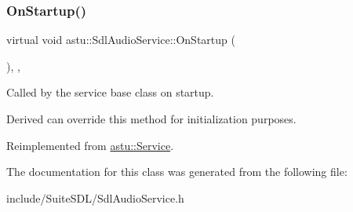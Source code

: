 \mbox{\label{classastu_1_1SdlAudioService_a1138e9e9ab37cbc78e37a6e529561c3b}} 
\subsubsection{\texorpdfstring{On\+Startup()}{OnStartup()}}
{\footnotesize\ttfamily virtual void astu\+::\+Sdl\+Audio\+Service\+::\+On\+Startup (\begin{DoxyParamCaption}{ }\end{DoxyParamCaption})\hspace{0.3cm}{\ttfamily [override]}, {\ttfamily [protected]}, {\ttfamily [virtual]}}

Called by the service base class on startup.

Derived can override this method for initialization purposes. 

Reimplemented from \hyperlink{classastu_1_1Service_a357dc663e000b1f086f681ec3c459bfe}{astu\+::\+Service}.



The documentation for this class was generated from the following file\+:\begin{DoxyCompactItemize}
\item 
include/\+Suite\+S\+D\+L/Sdl\+Audio\+Service.\+h\end{DoxyCompactItemize}
